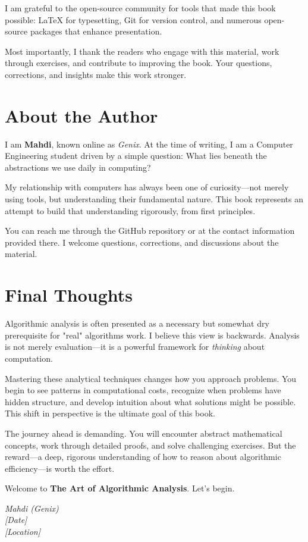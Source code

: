 I am grateful to the open-source community for tools that made this book possible: \LaTeX{} for typesetting, Git for version control, and numerous open-source packages that enhance presentation.

Most importantly, I thank the readers who engage with this material, work through exercises, and contribute to improving the book. Your questions, corrections, and insights make this work stronger.

\section*{About the Author}

I am \textbf{Mahdi}, known online as \textit{Genix}. At the time of writing, I am a Computer Engineering student driven by a simple question: What lies beneath the abstractions we use daily in computing?

My relationship with computers has always been one of curiosity—not merely using tools, but understanding their fundamental nature. This book represents an attempt to build that understanding rigorously, from first principles.

You can reach me through the GitHub repository or at the contact information provided there. I welcome questions, corrections, and discussions about the material.

\section*{Final Thoughts}

Algorithmic analysis is often presented as a necessary but somewhat dry prerequisite for "real" algorithms work. I believe this view is backwards. Analysis is not merely evaluation—it is a powerful framework for \textit{thinking} about computation.

Mastering these analytical techniques changes how you approach problems. You begin to see patterns in computational costs, recognize when problems have hidden structure, and develop intuition about what solutions might be possible. This shift in perspective is the ultimate goal of this book.

The journey ahead is demanding. You will encounter abstract mathematical concepts, work through detailed proofs, and solve challenging exercises. But the reward—a deep, rigorous understanding of how to reason about algorithmic efficiency—is worth the effort.

Welcome to \textbf{The Art of Algorithmic Analysis}. Let's begin.

\vspace{1cm}

\begin{flushright}
\textit{Mahdi (Genix)} \\
\textit{[Date]} \\
\textit{[Location]}
\end{flushright}

\clearpage
